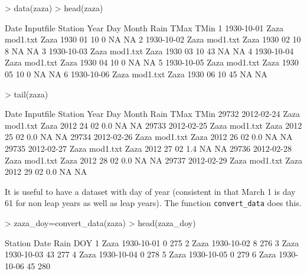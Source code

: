 \documentclass{article}
\begin{document}
\begin{Schunk}
\begin{Sinput}
> data(zaza)
> head(zaza)
\end{Sinput}
\begin{Soutput}
        Date     Inputfile Station Year Day Month Rain TMax TMin
1 1930-10-01 Zaza mod1.txt    Zaza 1930  01    10    0   NA   NA
2 1930-10-02 Zaza mod1.txt    Zaza 1930  02    10    8   NA   NA
3 1930-10-03 Zaza mod1.txt    Zaza 1930  03    10   43   NA   NA
4 1930-10-04 Zaza mod1.txt    Zaza 1930  04    10    0   NA   NA
5 1930-10-05 Zaza mod1.txt    Zaza 1930  05    10    0   NA   NA
6 1930-10-06 Zaza mod1.txt    Zaza 1930  06    10   45   NA   NA
\end{Soutput}
\begin{Sinput}
> tail(zaza)
\end{Sinput}
\begin{Soutput}
            Date     Inputfile Station Year Day Month Rain TMax TMin
29732 2012-02-24 Zaza mod1.txt    Zaza 2012  24    02  0.0   NA   NA
29733 2012-02-25 Zaza mod1.txt    Zaza 2012  25    02  0.0   NA   NA
29734 2012-02-26 Zaza mod1.txt    Zaza 2012  26    02  0.0   NA   NA
29735 2012-02-27 Zaza mod1.txt    Zaza 2012  27    02  1.4   NA   NA
29736 2012-02-28 Zaza mod1.txt    Zaza 2012  28    02  0.0   NA   NA
29737 2012-02-29 Zaza mod1.txt    Zaza 2012  29    02  0.0   NA   NA
\end{Soutput}
\end{Schunk}

It is useful to have a dataset with day of year (consistent in that March 1 is
day 61 for non leap years as well as leap years).  The function {\tt convert\_data}
does this.
\begin{Schunk}
\begin{Sinput}
> zaza_doy=convert_data(zaza)
> head(zaza_doy)
\end{Sinput}
\begin{Soutput}
  Station       Date Rain DOY
1    Zaza 1930-10-01    0 275
2    Zaza 1930-10-02    8 276
3    Zaza 1930-10-03   43 277
4    Zaza 1930-10-04    0 278
5    Zaza 1930-10-05    0 279
6    Zaza 1930-10-06   45 280
\end{Soutput}
\end{Schunk}
\end{document}
